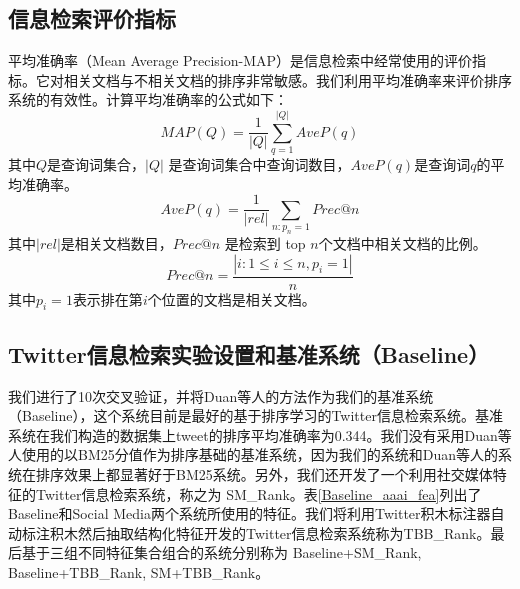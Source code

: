 \subsection{信息检索评价指标}
\label{MAP}
平均准确率（Mean Average Precision-MAP）是信息检索中经常使用的评价指标。它对相关文档与不相关文档的排序非常敏感。我们利用平均准确率来评价排序系统的有效性。计算平均准确率的公式如下：
$$MAP(Q)=\frac{1}{|Q|}\sum_{q=1}^{|Q|}AveP(q)$$
其中$Q$是查询词集合，$|Q|$ 是查询词集合中查询词数目，$AveP(q)$是查询词$q$的平均准确率。
$$AveP(q)=\frac{1}{|rel|}\sum_{n:p_n = 1}Prec@n$$
其中$|rel|$是相关文档数目，$Prec@n$ 是检索到 top $n$个文档中相关文档的比例。
$$Prec@n=\frac{|{i:1\leq i \leq n,p_i =1}|}{n}$$
其中$p_i = 1$表示排在第$i$个位置的文档是相关文档。

\subsection{Twitter信息检索实验设置和基准系统（Baseline）}
我们进行了10次交叉验证，并将Duan等人的方法作为我们的基准系统（Baseline），这个系统目前是最好的基于排序学习的Twitter信息检索系统。基准系统在我们构造的数据集上tweet的排序平均准确率为0.344。我们没有采用Duan等人使用的以BM25分值作为排序基础的基准系统，因为我们的系统和Duan等人的系统在排序效果上都显著好于BM25系统。另外，我们还开发了一个利用社交媒体特征的Twitter信息检索系统，称之为 SM\_Rank。表\ref{Baseline_aaai_fea}列出了Baseline和Social Media两个系统所使用的特征。我们将利用Twitter积木标注器自动标注积木然后抽取结构化特征开发的Twitter信息检索系统称为TBB\_Rank。最后基于三组不同特征集合组合的系统分别称为 Baseline+SM\_Rank, Baseline+TBB\_Rank, SM+TBB\_Rank。

